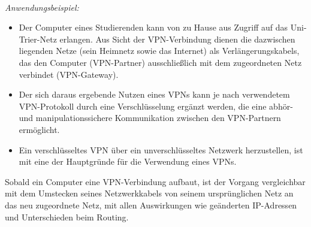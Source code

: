 ~\\
\textit{Anwendungsbeispiel:}
\begin{itemize}
	\item Der Computer eines Studierenden kann von zu Hause aus Zugriff auf das Uni-Trier-Netz erlangen. Aus Sicht der VPN-Verbindung dienen die dazwischen liegenden Netze (sein Heimnetz sowie das Internet) als Verlängerungskabels, das den Computer (VPN-Partner) ausschließlich mit dem zugeordneten Netz verbindet (VPN-Gateway).
\item Der sich daraus ergebende Nutzen eines VPNs kann je nach verwendetem VPN-Protokoll durch eine Verschlüsselung ergänzt werden, die eine abhör- und manipulationssichere Kommunikation zwischen den VPN-Partnern ermöglicht.
\item Ein verschlüsseltes VPN über ein unverschlüsseltes Netzwerk herzustellen, ist mit eine der Hauptgründe für die Verwendung eines VPNs.
\end{itemize}
Sobald ein Computer eine VPN-Verbindung aufbaut, ist der Vorgang vergleichbar mit dem Umstecken seines Netzwerkkabels von seinem ursprünglichen Netz an das neu zugeordnete Netz, mit allen Auswirkungen wie geänderten IP-Adressen und Unterschieden beim Routing.


